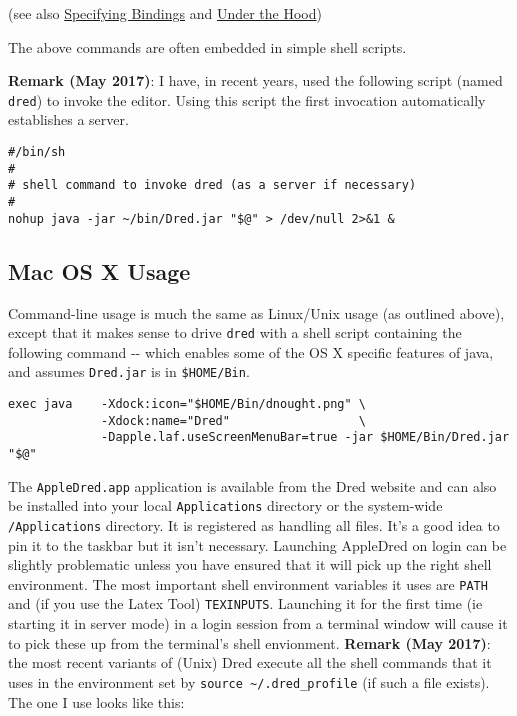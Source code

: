 \documentclass[
]{article}
\begin{document}
(see also \href{Bindings.html}{Specifying Bindings} and
\href{Underhood.html}{Under the Hood})

The above commands are often embedded in simple shell scripts.

\textbf{Remark (May 2017)}: I have, in recent years, used the following
script (named \texttt{dred}) to invoke the editor. Using this script the
first invocation automatically establishes a server.

\begin{verbatim}
#/bin/sh
#
# shell command to invoke dred (as a server if necessary)
#
nohup java -jar ~/bin/Dred.jar "$@" > /dev/null 2>&1 &
\end{verbatim}

\hfill\break
\protect\hypertarget{MACOS}{}{}

\hypertarget{mac-os-x-usage}{%
\subsection{Mac OS X Usage}\label{mac-os-x-usage}}

Command-line usage is much the same as Linux/Unix usage (as outlined
above), except that it makes sense to drive \texttt{dred} with a shell
script containing the following command -\/- which enables some of the
OS X specific features of java, and assumes \texttt{Dred.jar} is in
\texttt{\$HOME/Bin}.

\begin{verbatim}
exec java    -Xdock:icon="$HOME/Bin/dnought.png" \
             -Xdock:name="Dred"                  \
             -Dapple.laf.useScreenMenuBar=true -jar $HOME/Bin/Dred.jar "$@" 
\end{verbatim}

The \texttt{AppleDred.app} application is available from the Dred
website and can also be installed into your local \texttt{Applications}
directory or the system-wide \texttt{/Applications} directory. It is
registered as handling all files. It's a good idea to pin it to the
taskbar but it isn't necessary. Launching AppleDred on login can be
slightly problematic unless you have ensured that it will pick up the
right shell environment. The most important shell environment variables
it uses are \texttt{PATH} and (if you use the Latex Tool)
\texttt{TEXINPUTS}. Launching it for the first time (ie starting it in
server mode) in a login session from a terminal window will cause it to
pick these up from the terminal's shell envionment. \textbf{Remark (May
2017)}: the most recent variants of (Unix) Dred execute all the shell
commands that it uses in the environment set by
\texttt{source\ \textasciitilde{}/.dred\_profile} (if such a file
exists). The one I use looks like this:
\end{document}
